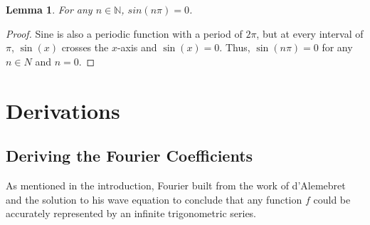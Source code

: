 \documentclass[11pt]{amsart}
\theoremstyle{plain}
\newtheorem{lemma}[theorem]{Lemma}
\theoremstyle{definition}
\newcommand{\N}{\mathbb N}
\begin{document}
\begin{lemma} \label{lem:trig2}
    For any $n\in\N$, $sin(n\pi) = 0$.
\end{lemma}
\vspace{-0.5cm}
\begin{proof}
    Sine is also a periodic function with a period of $2\pi$, but at every interval of $\pi$, $\sin(x)$ crosses the $x$-axis and $\sin(x)=0$. Thus, $\sin(n\pi) = 0$ for any $n\in N$ and $n=0$. 
\end{proof}

\section{Derivations}
\subsection{Deriving the Fourier Coefficients}\label{deriving}
As mentioned in the introduction, Fourier built from the work of d'Alemebret and the solution to his wave equation to conclude that any function $f$ could be accurately represented by an infinite trigonometric series.
\end{document}

